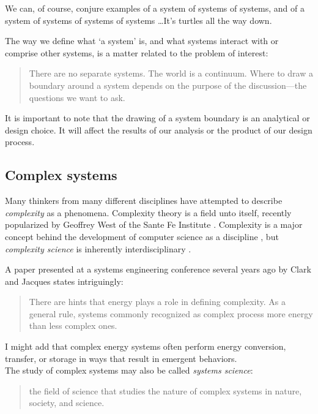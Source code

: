 \documentclass[10pt]{article}
\begin{document}
We can, of course, conjure examples of a system of systems of systems, and of a system of systems of systems of systems \ldots It's turtles all the way down.

The way we define what `a system' is, and what systems interact with or comprise other systems, is a matter related to the problem of interest:

\begin{quote}
    There are no separate systems. The world is a continuum. Where to draw a boundary around a system depends on the purpose of the discussion---the questions we want to ask. \cite{Donella_H_Meadows2016-nq}
\end{quote}

It is important to note that the drawing of a system boundary is an analytical or design choice. It will affect the results of our analysis or the product of our design process.

\subsection{Complex systems}

Many thinkers from many different disciplines have attempted to describe \textit{complexity} as a phenomena. Complexity theory is a field unto itself, recently popularized by Geoffrey West of the Sante Fe Institute \cite{scale}. Complexity is a major concept behind the development of computer science as a discipline \cite{Hartmanis1994-sq}, but \textit{complexity science} is inherently interdisciplinary \cite{Downey2012-ce}.

A paper presented at a systems engineering conference several years ago by Clark and Jacques states intriguingly:

\begin{quote}
There are hints that energy plays a role in defining complexity. As a general rule, systems commonly  recognized as complex process more energy than less complex ones. \cite{Clark2012-bm}
\end{quote}

I might add that complex energy systems often perform energy conversion, transfer, or storage in ways that result in emergent behaviors.\\

The study of complex systems may also be called \textit{systems science}: \begin{quote}
    the field of science that studies the nature of complex systems in nature, society, and science. \cite{noauthor_undated-rd}
\end{quote}
\end{document}
